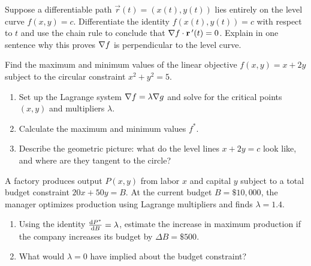 \begin{exercise}
\label{ch33:exr-proofperp}
Suppose a differentiable path $\vec r(t) = (x(t), y(t))$ lies entirely on the level
curve $f(x,y) = c$. Differentiate the identity $f(x(t),y(t)) = c$ with respect to
$t$ and use the chain rule to conclude that $\nabla f \cdot \mathbf{r}\,'(t) = 0$.
Explain in one sentence why this proves $\nabla f$ is perpendicular to the level
curve.
\end{exercise}

\begin{exercise}
\label{ch33:exr-lagrange-circle}
Find the maximum and minimum values of the linear objective $f(x,y) = x + 2y$ subject to the circular constraint $x^2 + y^2 = 5$.
\begin{enumerate}[label=(\alph*)]
  \item Set up the Lagrange system $\nabla f = \lambda \nabla g$ and solve for the critical points $(x,y)$ and multipliers $\lambda$.
  \item Calculate the maximum and minimum values $f^*$.
  \item Describe the geometric picture: what do the level lines $x+2y=c$ look like, and where are they tangent to the circle?
\end{enumerate}
\end{exercise}

\begin{exercise}
\label{ch33:exr-shadow-price}
A factory produces output $P(x,y)$ from labor $x$ and capital $y$ subject to a total budget constraint $20x + 50y = B$. At the current budget $B=\$10{,}000$, the manager optimizes production using Lagrange multipliers and finds $\lambda = 1.4$.
\begin{enumerate}[label=(\alph*)]
  \item Using the identity $\frac{\mathrm{d} P^*}{\mathrm{d} B} = \lambda$, estimate the increase in maximum production if the company increases its budget by $\Delta B = \$500$.
  \item What would $\lambda = 0$ have implied about the budget constraint?
\end{enumerate}
\end{exercise}
